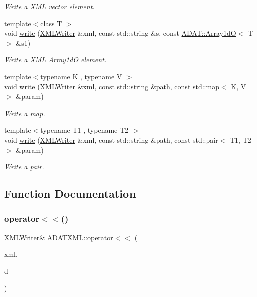 \begin{DoxyCompactItemize}
\begin{DoxyCompactList}\small\item\em Write a X\+ML vector element. \end{DoxyCompactList}\item 
{\footnotesize template$<$class T $>$ }\\void \mbox{\hyperlink{group__io_ga4aca42ea47cabf4b5644cf09729343ce}{write}} (\mbox{\hyperlink{classADATXML_1_1XMLWriter}{X\+M\+L\+Writer}} \&xml, const std\+::string \&s, const \mbox{\hyperlink{classADAT_1_1Array1dO}{A\+D\+A\+T\+::\+Array1dO}}$<$ T $>$ \&s1)
\begin{DoxyCompactList}\small\item\em Write a X\+ML Array1dO element. \end{DoxyCompactList}\item 
{\footnotesize template$<$typename K , typename V $>$ }\\void \mbox{\hyperlink{group__io_gaab13ff0d8972a4435cd3590b6c87ea05}{write}} (\mbox{\hyperlink{classADATXML_1_1XMLWriter}{X\+M\+L\+Writer}} \&xml, const std\+::string \&path, const std\+::map$<$ K, V $>$ \&param)
\begin{DoxyCompactList}\small\item\em Write a map. \end{DoxyCompactList}\item 
{\footnotesize template$<$typename T1 , typename T2 $>$ }\\void \mbox{\hyperlink{group__io_gabcda0d5bebd682903ae663861766df8b}{write}} (\mbox{\hyperlink{classADATXML_1_1XMLWriter}{X\+M\+L\+Writer}} \&xml, const std\+::string \&path, const std\+::pair$<$ T1, T2 $>$ \&param)
\begin{DoxyCompactList}\small\item\em Write a pair. \end{DoxyCompactList}\end{DoxyCompactItemize}


\subsection{Function Documentation}
\mbox{\label{namespaceADATXML_a5588aaaf70ed009fbd91977db5399dd1}} 
\subsubsection{\texorpdfstring{operator$<$$<$()}{operator<<()}}
{\footnotesize\ttfamily \mbox{\hyperlink{classADATXML_1_1XMLWriter}{X\+M\+L\+Writer}}\& A\+D\+A\+T\+X\+M\+L\+::operator$<$$<$ (\begin{DoxyParamCaption}\item[{\mbox{\hyperlink{classADATXML_1_1XMLWriter}{X\+M\+L\+Writer}} \&}]{xml,  }\item[{const string \&}]{d }\end{DoxyParamCaption})}

